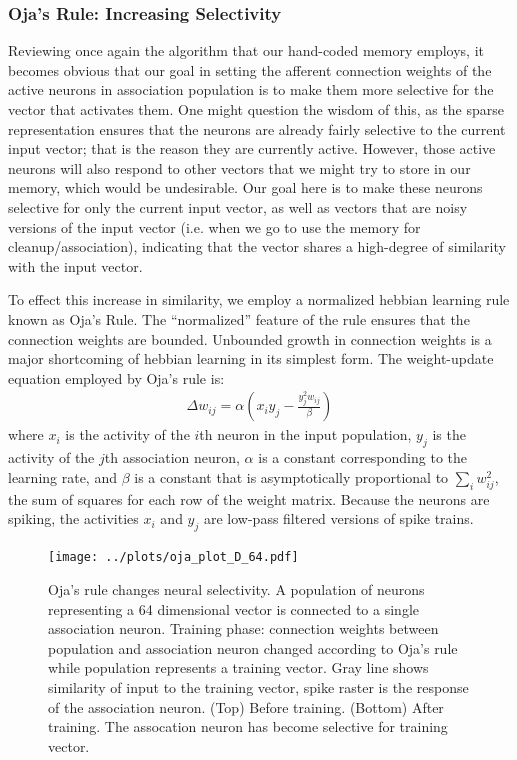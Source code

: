 \documentclass[10pt,letterpaper]{article}
\begin{document}
\subsubsection{Oja's Rule: Increasing Selectivity}
Reviewing once again the algorithm that our hand-coded memory employs, it becomes obvious that our goal in setting the afferent connection weights of the active neurons in association population is to make them more selective for the vector that activates them. One might question the wisdom of this, as the sparse representation ensures that the neurons are already fairly selective to the current input vector; that is the reason they are currently active. However, those active neurons will also respond to other vectors that we might try to store in our memory, which would be undesirable. Our goal here is to make these neurons selective for only the current input vector, as well as vectors that are noisy versions of the input vector (i.e. when we go to use the memory for cleanup/association), indicating that the vector shares a high-degree of similarity with the input vector.

To effect this increase in similarity, we employ a normalized hebbian learning rule known as Oja's Rule. The ``normalized'' feature of the rule ensures that the connection weights are bounded. Unbounded growth in connection weights is a major shortcoming of hebbian learning in its simplest form. The weight-update equation employed by Oja's rule is:
\begin{align}
  \Delta w_{ij} = \alpha (x_i y_j - \frac{y_j^2 w_{ij}}{\beta})
\end{align}
where $x_i$ is the activity of the $i$th neuron in the input population, $y_j$ is the activity of the $j$th association neuron, $\alpha$ is a constant corresponding to the learning rate, and $\beta$ is a constant that is asymptotically proportional to $\sum_i w_{ij}^2$, the sum of squares for each row of the weight matrix. Because the neurons are spiking, the activities $x_i$ and $y_j$ are low-pass filtered versions of spike trains.

\begin{figure}[ht]
\centering
\texttt{[image: ../plots/oja\_plot\_D\_64.pdf]}
\caption{Oja's rule changes neural selectivity. A population of neurons representing a 64 dimensional vector is connected to a single association neuron. Training phase: connection weights between population and association neuron changed according to Oja's rule while population represents a training vector. Gray line shows similarity of input to the training vector, spike raster is the response of the association neuron. (Top) Before training. (Bottom) After training. The assocation neuron has become selective for training vector.}
\label{fig:oja}
\end{figure}
\end{document}
